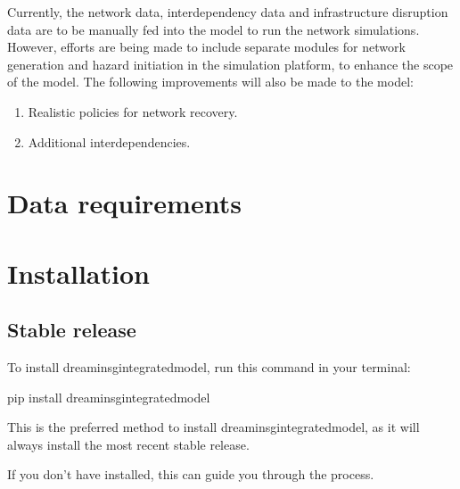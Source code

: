 \documentclass[letterpaper,10pt,english]{sphinxmanual}
\begin{document}
\sphinxAtStartPar
Currently, the network data, interdependency data and infrastructure disruption data are to be manually fed into the model to run the network simulations.
However, efforts are being made to include separate modules for network generation and hazard initiation in the simulation platform, to enhance the scope of the model.
The following improvements will also be made to the model:
\begin{enumerate}
%
\item {} 
\sphinxAtStartPar
Realistic policies for network recovery.

\item {} 
\sphinxAtStartPar
Additional interdependencies.

\end{enumerate}


\chapter{Data requirements}
\label{\detokenize{data_req:data-requirements}}\label{\detokenize{data_req::doc}}

\chapter{Installation}
\label{\detokenize{installation:installation}}\label{\detokenize{installation::doc}}

\section{Stable release}
\label{\detokenize{installation:stable-release}}
\sphinxAtStartPar
To install dreaminsg\sphinxhyphen{}integrated\sphinxhyphen{}model, run this command in your terminal:

\begin{sphinxVerbatim}[commandchars=\\\{\}]
pip install dreaminsg\PYGZus{}integrated\PYGZus{}model
\end{sphinxVerbatim}

\sphinxAtStartPar
This is the preferred method to install dreaminsg\sphinxhyphen{}integrated\sphinxhyphen{}model, as it will always install the most recent stable release.

\sphinxAtStartPar
If you don’t have  installed, this  can guide
you through the process.
\end{document}
